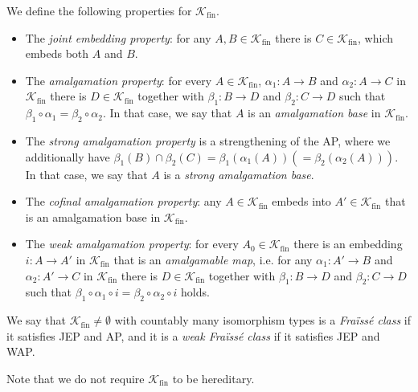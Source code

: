 \documentclass[10pt,a4paper]{article}
\theoremstyle{definition}
\theoremstyle{remark}
\newcommand \maps {\colon} %
\newcommand \K {\mathscr{K}}
\newcommand \fin {{\operatorname{fin}}}
\begin{document}
We define the following properties for $\K_\fin$.
\begin{itemize}
    \item[(JEP)] The {\it joint embedding property}: for any $A,B\in\mathcal{K}_\fin$ there is $C\in \mathcal{K}_\fin$, which embeds both $A$ and $B$.
    
    \item[(AP)] The {\it amalgamation property}: for every $A\in \mathcal{K}_\fin$, $\alpha_1\colon A\to B$ and $\alpha_2\colon A\to C$ in $\mathcal{K}_\fin$ there is $D\in \mathcal{K}_\fin$ together with $\beta_1\colon B\to D$ and $\beta_2\colon C\to D$ such that $\beta_1\circ\alpha_1=\beta_2\circ \alpha_2$.
    In that case, we say that $A$ is an {\it amalgamation base} in $\mathcal{K}_\fin$.
    
    \item[(SAP)] The {\it strong amalgamation property} is a strengthening of the AP, where we additionally have $\beta_1(B)\cap \beta_2(C)=\beta_1(\alpha_1(A)) (=\beta_2(\alpha_2(A))) $.  In that case, we say that $A$ is a {\it strong amalgamation base}. 
    \item[(CAP)] The {\it cofinal amalgamation property}:  any $A\in \mathcal{K}_\fin$ embeds into $A'\in \mathcal{K}_\fin$ that is an amalgamation base in $\mathcal{K}_\fin$.
    
    \item[(WAP)] The \emph{weak amalgamation property}:
    for every $A_0 \in \K_\fin$ there is an embedding $i\maps A \to A'$ in $\K_\fin$ that is an \emph{amalgamable map}, i.e. for any $\alpha_1\colon A' \to B$ and $\alpha_2\colon A'\to C$ in $\mathcal{K}_\fin$ there is $D\in \mathcal{K}_\fin$ together with $\beta_1\colon B\to D$ and $\beta_2\colon C\to D$ such that $\beta_1\circ \alpha_1\circ i=\beta_2\circ \alpha_2\circ i$ holds.
\end{itemize}

We say that $\K_\fin \neq \emptyset$ with countably many isomorphism types is a \emph{Fraïssé class} if it satisfies JEP and AP, and it is a \emph{weak Fraïssé class} if it satisfies JEP and WAP.

Note that we do not require $\K_\fin$ to be hereditary.

\medskip
\end{document}
